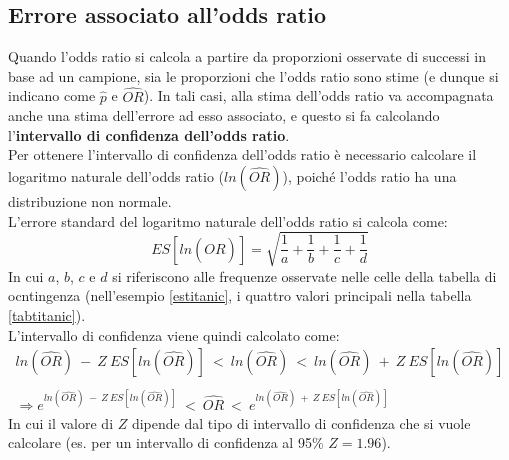 \documentclass[10pt, draft]{book}
\begin{document}
\subsection{Errore associato all'odds ratio}
Quando l'odds ratio si calcola a partire da proporzioni osservate di successi in base ad un campione, sia le proporzioni che l'odds ratio sono stime (e dunque si indicano come $\hat{p}$ e $\hat{OR}$). In tali casi, alla stima dell'odds ratio va accompagnata anche una stima dell'errore ad esso associato, e questo si fa calcolando l'\textbf{intervallo di confidenza dell'odds ratio}.
\\
Per ottenere l'intervallo di confidenza dell'odds ratio è necessario calcolare il logaritmo naturale dell'odds ratio ($ln(\hat{OR})$), poiché l'odds ratio ha una distribuzione non normale.
\\
L'errore standard del logaritmo naturale dell'odds ratio si calcola come:
\begin{equation}
ES[ln(\hat{OR})] = \sqrt{\frac{1}{a}+\frac{1}{b}+\frac{1}{c}+\frac{1}{d}}
\end{equation}
In cui $a$, $b$, $c$ e $d$ si riferiscono alle frequenze osservate nelle celle della tabella di ocntingenza (nell'esempio \ref{estitanic}, i quattro valori principali nella tabella \ref{tabtitanic}).
\\
L'intervallo di confidenza viene quindi calcolato come:
\begin{align*}
    ln(\hat{OR})\ -\ Z\ ES[ln(\hat{OR})]\ <\ ln(\hat{OR})\ <\ ln(\hat{OR})\ +\ Z\ ES[ln(\hat{OR})]
    \\ \\
    \Rightarrow e^{ln(\hat{OR})\ -\ Z\ ES[ln(\hat{OR})]}\ <\ \hat{OR}\ <\ e^{ln(\hat{OR})\ +\ Z\ ES[ln(\hat{OR})]}
\end{align*}
In cui il valore di $Z$ dipende dal tipo di intervallo di confidenza che si vuole calcolare (es. per un intervallo di confidenza al 95\% $Z = 1.96$).
\\
\end{document}
